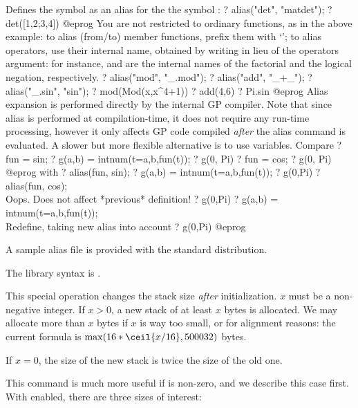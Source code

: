\label{se:alias}
Defines the symbol  as an alias for the the symbol :
\bprog
? alias("det", "matdet");
? det([1,2;3,4])
@eprog\noindent
You are not restricted to ordinary functions, as in the above example:
to alias (from/to) member functions, prefix them with `';
to alias operators, use their internal name, obtained by writing
\kbd{\_} in lieu of the operators argument: for instance, \kbd{\_!} and
\kbd{!\_} are the internal names of the factorial and the
logical negation, respectively.
\bprog
? alias("mod", "_.mod");
? alias("add", "_+_");
? alias("_.sin", "sin");
? mod(Mod(x,x^4+1))
? add(4,6)
? Pi.sin
@eprog
Alias expansion is performed directly by the internal GP compiler.
Note that since alias is performed at compilation-time, it does not
require any run-time processing, however it only affects GP code
compiled \emph{after} the alias command is evaluated. A slower but more
flexible alternative is to use variables. Compare
\bprog
? fun = sin;
? g(a,b) = intnum(t=a,b,fun(t));
? g(0, Pi)
? fun = cos;
? g(0, Pi)
@eprog\noindent
with
\bprog
? alias(fun, sin);
? g(a,b) = intnum(t=a,b,fun(t));
? g(0,Pi)
? alias(fun, cos);  \\ Oops. Does not affect *previous* definition!
? g(0,Pi)
? g(a,b) = intnum(t=a,b,fun(t)); \\ Redefine, taking new alias into account
? g(0,Pi)
@eprog

A sample alias file  is provided with
the standard distribution.

The library syntax is .

\label{se:allocatemem}
This special operation changes the stack size \emph{after}
initialization. $x$ must be a non-negative integer. If $x > 0$, a new stack
of at least $x$ bytes is allocated. We may allocate more than $x$ bytes if
$x$ is way too small, or for alignment reasons: the current formula is
$\max(16*\ceil{x/16}, 500032)$ bytes.

If $x=0$, the size of the new stack is twice the size of the old one.

This command is much more useful if  is non-zero, and we
describe this case first. With  enabled, there are three
sizes of interest:

